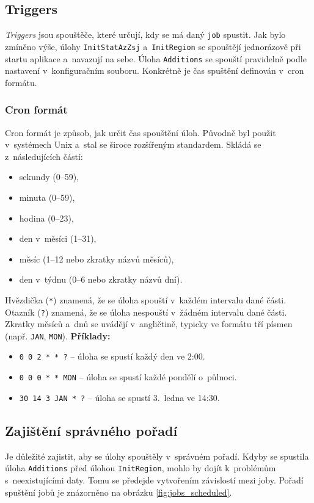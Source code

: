 \subsection{Triggers}
\textit{Triggers} jsou spouštěče, které určují, kdy se má daný \texttt{job} spustit.
Jak bylo zmíněno výše, úlohy \texttt{InitStatAzZsj} a~\texttt{InitRegion} se spouštějí jednorázově při startu aplikace a~navazují na sebe.
Úloha \texttt{Additions} se spouští pravidelně podle nastavení v~konfiguračním souboru.
Konkrétně je čas spuštění definován v~cron formátu.

\subsubsection*{Cron formát}
Cron formát je způsob, jak určit čas spouštění úloh.
Původně byl použit v~systémech Unix a~stal se široce rozšířeným standardem.
Skládá se z~následujících částí:
\begin{itemize}
    \item sekundy (0--59),
    \item minuta (0--59),
    \item hodina (0--23),
    \item den v~měsíci (1--31),
    \item měsíc (1--12 nebo zkratky názvů měsíců),
    \item den v~týdnu (0--6 nebo zkratky názvů dní).
\end{itemize}
Hvězdička (\texttt{*}) znamená, že se úloha spouští v~každém intervalu dané části.
Otazník (\texttt{?}) znamená, že se úloha nespouští v~žádném intervalu dané části.
Zkratky měsíců a~dnů se uvádějí v~angličtině, typicky ve formátu tří písmen (např. \texttt{JAN}, \texttt{MON}).
\textbf{Příklady:}
\begin{itemize}
    \item \texttt{0 0 2 * * ?} -- úloha se spustí každý den ve 2:00.
    \item \texttt{0 0 0 * * MON} -- úloha se spustí každé pondělí o~půlnoci.
    \item \texttt{30 14 3 JAN * ?} -- úloha se spustí 3.~ledna ve 14:30.
\end{itemize}

\subsection{Zajištění správného pořadí}
Je důležité zajistit, aby se úlohy spouštěly v~správném pořadí.
Kdyby se spustila úloha \texttt{Additions} před úlohou \texttt{InitRegion}, 
mohlo by dojít k~problémům s~neexistujícími daty.
Tomu se předejde vytvořením závislostí mezi joby.
Pořadí spuštění jobů je znázorněno na obrázku \ref{fig:jobs_scheduled}.

